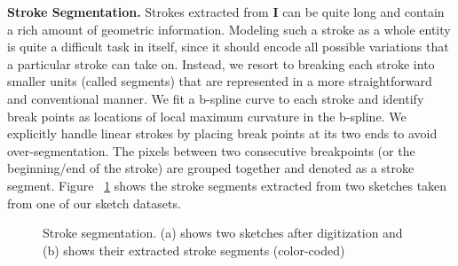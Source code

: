 \noindent\textbf{Stroke Segmentation.} Strokes extracted from $\mathbf{I}$ can be quite long and contain a rich amount of geometric information. Modeling such a stroke as a whole entity is quite a difficult task in itself, since it should encode all possible variations that a particular stroke can take on. Instead, we resort to breaking each stroke into smaller units (called segments) that are represented in a more straightforward and conventional manner. We fit a b-spline curve to each stroke and identify break points as locations of local maximum curvature in the b-spline. We explicitly handle linear strokes by placing break points at its two ends to avoid over-segmentation. The pixels between two consecutive breakpoints (or the beginning/end of the stroke) are grouped together and denoted as a stroke segment. Figure ~\ref{fig:Figure3} shows the stroke segments extracted from two sketches taken from one of our sketch datasets.

\vspace{-2mm}
\begin{figure}[htbp]
\centering
{}
\vspace{-3mm}
\caption {Stroke segmentation. (a) shows two sketches after digitization and (b) shows their extracted stroke segments (color-coded)}\vspace{-3mm}
\label {fig:Figure3}
\end{figure}

